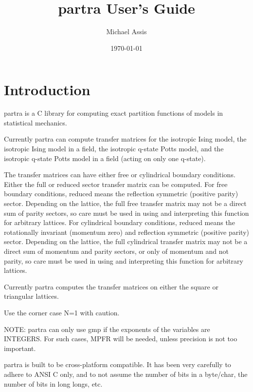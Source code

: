 \documentclass{article}
\begin{document}
\title{partra User's Guide}
\author{Michael Assis}
\date{\today}
\maketitle


\section{Introduction}
partra is a C library for computing exact partition functions of models in statistical mechanics. 

Currently partra can compute transfer matrices for the isotropic Ising model, the isotropic Ising model in a field, the isotropic q-state Potts model, and the isotropic q-state Potts model in a field (acting on only one q-state).

The transfer matrices can have either free or cylindrical boundary conditions. Either the full or reduced sector transfer matrix can be computed. For free boundary conditions, reduced means the reflection symmetric (positive parity) sector. Depending on the lattice, the full free transfer matrix may not be a direct sum of parity sectors, so care must be used in using and interpreting this function for arbitrary lattices. For cylindrical boundary conditions, reduced means the rotationally invariant (momentum zero) and reflection symmetric (positive parity) sector. Depending on the lattice, the full cylindrical transfer matrix may not be a direct sum of momentum and parity sectors, or only of momentum and not parity, so care must be used in using and interpreting this function for arbitrary lattices.

Currently partra computes the transfer matrices on either the square or triangular lattices. 

Use the corner case N=1 with caution.


NOTE: partra can only use gmp if the exponents of the variables are INTEGERS. For such cases, MPFR will be needed, unless precision is not too important. 


partra is built to be cross-platform compatible. It has been very carefully to adhere to ANSI C only, and to not assume the number of bits in a byte/char, the number of bits in long longs, etc. 
\end{document}
